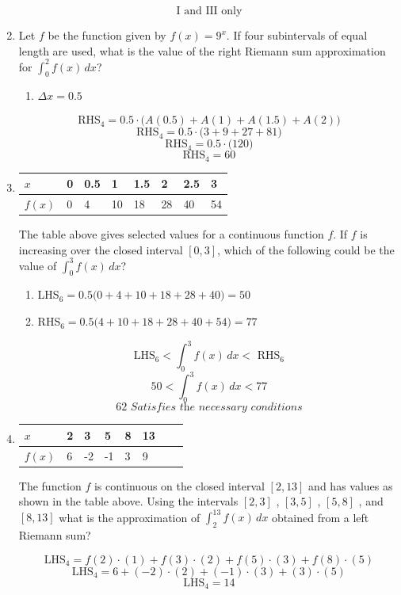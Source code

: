 \documentclass[12pt]{article}
\begin{document}
\begin{enumerate}
$$\boxed{\text{I and III only}}$$
\item 
Let $f$ be the function given by $f(x)=9^x$. If four subintervals of equal length are used, what is the value of the right Riemann sum approximation for $\int_{0}^{2} f(x) \,dx$?
\begin{enumerate}
    \item $\Delta x = 0.5$
\end{enumerate}
$$\text{RHS}_4 = 0.5 \cdot \big( A(0.5) +A(1) +A(1.5)+ A(2) \big)$$
$$\text{RHS}_4 = 0.5 \cdot \big( 3 +9 + 27+ 81 \big)$$
$$\text{RHS}_4 = 0.5 \cdot \big(120)$$
$$\boxed{\text{RHS}_4 = 60}$$
\item 
\begin{table}[H]
\centering
\begin{tabular}{|l||l|l|l|l|l|l|l|}
\hline
$x$ & 0 & 0.5 & 1 & 1.5 & 2 & 2.5 & 3 \\ \hline
$f(x)$ & 0 & 4 & 10 & 18 & 28 & 40 & 54 \\ \hline
\end{tabular}
\end{table}
The table above gives selected values for a continuous function $f$. If $f$ is increasing over the closed interval $[0,3]$, which of the following could be the value of $\int_{0}^{3} f(x)\, dx$?
\begin{enumerate}
\item LHS$_6= 0.5 \big( 0+4+10+18+28+40 \big) = 50$
  \item  RHS$_6= 0.5 \big( 4+10+18+28+40+54 \big) = 77$
\end{enumerate}
$$\text{LHS}_6<\int_{0}^{3} f(x)\, dx <\text{ RHS}_6 $$
$$50<\int_{0}^{3} f(x)\, dx <77 $$
$$\boxed{62 \textit{ Satisfies the necessary conditions}}$$

\item 
\begin{table}[H]
\centering
\begin{tabular}{|l||l|l|l|l|l|l|l|}
\hline
$x$ & 2 & 3 & 5 & 8 & 13 \\ \hline
$f(x)$ & 6 & -2 & -1 & 3 & 9 \\ \hline
\end{tabular}
\end{table}
The function $f$ is continuous on the closed interval $[2,13]$ and has values as shown in the table above. Using the intervals $[2,3]$ , $[3,5]$ , $[5,8]$ , and $[8,13]$ what is the approximation of $\int_{2}^{13} f(x)\, dx$ obtained from a left Riemann sum?

$$\text{LHS}_4 = f(2) \cdot (1) + f(3)\cdot (2) + f(5) \cdot (3) +f(8) \cdot (5)$$
$$\text{LHS}_4 = 6  + (-2)\cdot (2) + (-1) \cdot (3) +(3) \cdot (5)$$
$$\boxed{\text{LHS}_4 = 14}$$


\end{enumerate}
\end{document}
